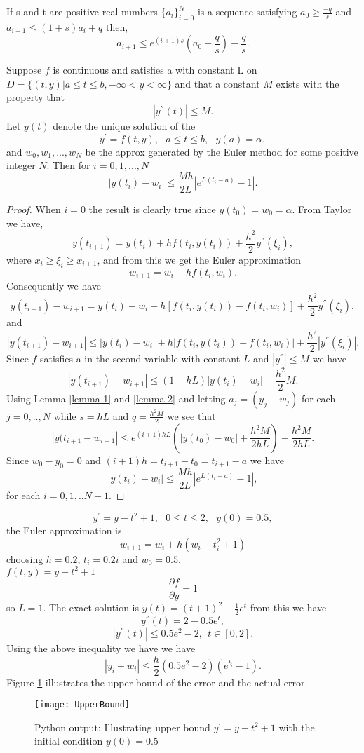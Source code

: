 \begin{lemma}
\label{lemma 2}
If s and t are positive real numbers $\{a_i\}_{i=0}^{N}$ is a sequence satisfying $\displaystyle a_0 \geq \frac{-q}{s}$ and $a_{i+1} \leq (1+s)a_i +q $
then,
\[a_{i+1} \leq e^{(i+1)s}\left(a_0+\frac{q}{s}\right)-\frac{q}{s}. \] 
\end{lemma}
\begin{theorem}
\label{Euler bound}
Suppose $f$ is continuous and satisfies a  with constant
L on $D=\{(t,y)|a\leq t \leq b, -\infty < y < \infty \}$ and that a constant $M$
exists with the property that 
\[ |y^{''}(t)|\leq M. \]
Let $y(t)$ denote the unique solution of the 
\[ y^{'}=f(t,y), \ \ \ a\leq t \leq b, \ \ \ y(a)=\alpha, \]
and $w_0,w_1,...,w_N$ be the approx generated by the Euler method for some
positive integer $N$.  Then for $i=0,1,...,N$
\[ |y(t_i)-w_i| \leq \frac{Mh}{2L}|e^{L(t_i-a)}-1|. \]
\end{theorem}
\begin{proof}
When $i=0$ the result is clearly true since $y(t_0)=w_0=\alpha$.
From Taylor we have,
\[y(t_{i+1})=y(t_i)+hf(t_i,y(t_i))+\frac{h^2}{2}y^{''}(\xi_i), \]
where $x_i \geq \xi_i \geq x_{i+1}$, and from this we get the Euler approximation
\[w_{i+1}=w_i + hf(t_i,w_i). \]
Consequently we have
\[y(t_{i+1})-w_{i+1}=y(t_i)-w_i+h[f(t_i,y(t_i))-f(t_i,w_i)]+\frac{h^2}{2}y^{''}(\xi_i), \]
and
\[|y(t_{i+1})-w_{i+1}|\leq |y(t_i)-w_i|+h|f(t_i,y(t_i))-f(t_i,w_i)|+\frac{h^2}{2}|y^{''}(\xi_i)|. \]
Since $f$ satisfies a  in the second variable with constant $L$
and $|y^{''}|\leq M$ we have
\[|y(t_{i+1})-w_{i+1}|\leq (1+hL)|y(t_i)-w_i|+\frac{h^2}{2}M. \]
Using Lemma \ref{lemma 1} and \ref{lemma 2} and letting $a_j=(y_j-w_j)$ for each
$j=0,..,N$ while $s=hL$ and $q=\frac{h^2M}{2}$ we see that
\[|y(t_{i+1}-w_{i+1}|\leq e^{(i+1)hL}(|y(t_0)-w_0|+\frac{h^2M}{2hL}) -\frac{h^2M}{2hL}. \]
Since $w_0-y_0=0$ and $(i+1)h=t_{i+1}-t_0=t_{i+1}-a$ we have
\[ |y(t_i)-w_i| \leq \frac{Mh}{2L}|e^{L(t_i-a)}-1|, \]
for each $i=0,1,..N-1$.
\end{proof}
\begin{example}
\[y^{'}=y-t^2+1, \ \ \ 0 \leq t \leq 2, \ \ \ y(0)=0.5, \]
the Euler approximation is
\[w_{i+1} = w_i + h(w_i-t_i^2+1) \]
choosing $h=0.2$, $t_i=0.2i$ and $w_0=0.5$. \\
$f(t,y)=y-t^2+1$
\[\frac{\partial f}{\partial y}=1 \]
so $L=1$. The exact solution is $y(t)=(t+1)^2-\frac{1}{2}e^t$ from this we have
\[y^{''}(t) = 2-0.5e^t, \]
\[|y^{''}(t)| \leq 0.5e^2-2, \ \ t\in[0,2].\]
Using the above inequality we have we have
\[|y_i-w_i| \leq \frac{h}{2}(0.5e^2-2)(e^{t_i}-1).\]
Figure \ref{UpperBound Figure} illustrates the upper bound of the error and the actual error.

\begin{figure}[H]
\centering
\texttt{[image: UpperBound]}
\caption{Python output: Illustrating upper bound $y^{'}=y-t^2+1$ with the initial condition $y(0)=0.5$ }
\label{UpperBound Figure}
\end{figure}
\end{example}
